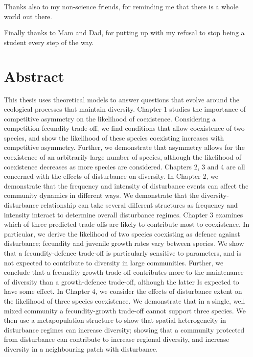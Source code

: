 \documentclass[a4paper]{report}
\begin{document}
Thanks also to my non-science friends, for reminding me that there is a whole world out there.

Finally thanks to Mam and Dad, for putting up with my refusal to stop being a student every step of the way. 

\chapter*{Abstract}
This thesis uses theoretical models to answer questions that evolve around the ecological processes that maintain diversity. Chapter 1 studies the importance of competitive asymmetry on the likelihood of coexistence. Considering a competition-fecundity trade-off, we find conditions that allow coexistence of two species, and show the likelihood of these species coexisting increases with competitive asymmetry. Further, we demonstrate that asymmetry allows for the coexistence of an arbitrarily large number of species, although the likelihood of coexistence decreases as more species are considered. Chapters 2, 3 and 4 are all concerned with the effects of disturbance on diversity. In Chapter 2, we demonstrate that the frequency and intensity of disturbance events can affect the community dynamics in different ways. We demonstrate that the diversity-disturbance relationship can take several different structures as frequency and intensity interact to determine overall disturbance regimes. Chapter 3 examines which of three predicted trade-offs are likely to contribute most to coexistence. In particular, we derive the likelihood of two species coexisting as defence against disturbance; fecundity and juvenile growth rates vary between species. We show that a fecundity-defence trade-off is particularly sensitive to parameters, and is not expected to contribute to diversity in large communities. Further, we conclude that a fecundity-growth trade-off contributes more to the maintenance of diversity than a growth-defence trade-off, although the latter Is expected to have some effect. In Chapter 4, we consider the effects of disturbance extent on the likelihood of three species coexistence. We demonstrate that in a single, well mixed community a fecundity-growth trade-off cannot support three species. We then use a metapopulation structure to show that spatial heterogeneity in disturbance regimes can increase diversity; showing that a community protected from disturbance can contribute to increase regional diversity, and increase diversity in a neighbouring patch with disturbance.
\end{document}
